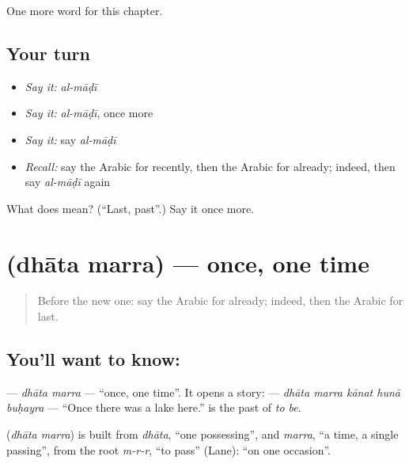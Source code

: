 \begin{grammarlens}[title={What you've built}]
One more word for this chapter.
\end{grammarlens}

\subsection*{Your turn}
\begin{itemize}
\raggedright
  \item \emph{Say it:} \emph{al-māḍī}
  \item \emph{Say it:} \emph{al-māḍī}, once more
  \item \emph{Say it:} say \emph{al-māḍī}
  \item \emph{Recall:} say the Arabic for recently, then the Arabic for already; indeed, then say \emph{al-māḍī} again
\end{itemize}

\begin{tcolorbox}[breakable,colback=teal!4,colframe=teal!35!black,title={Before you move on}]
What does  mean? (\textquotedblleft{}Last, past\textquotedblright{}.) Say it once more.
\end{tcolorbox}
\section[\texorpdfstring{\ar{ذات} \ar{مرة} (dhāta marra)}{ذات مرة (dhāta marra)}]{  (dhāta marra) — once, one time}

\label{lesson:AR-C156-dhata-marra}



\begin{quote}
Before the new one: say the Arabic for already; indeed, then the Arabic for last.
\end{quote}

\subsection*{You'll want to know:  }
\textbf{ } — \emph{dhāta marra} — \textquotedblleft{}once, one time\textquotedblright{}. It opens a story: \textbf{    } — \emph{dhāta marra kānat hunā buḥayra} — \textquotedblleft{}Once there was a lake here.\textquotedblright{} \textbf{} is the past of \emph{to be}.

\begin{cousinweb}
\textbf{ } (\emph{dhāta marra}) is built from \emph{dhāta}, \textquotedblleft{}one possessing\textquotedblright{}, and \emph{marra}, \textquotedblleft{}a time, a single passing\textquotedblright{}, from the root \emph{m-r-r}, \textquotedblleft{}to pass\textquotedblright{} (Lane): \textquotedblleft{}on one occasion\textquotedblright{}.
\end{cousinweb}

